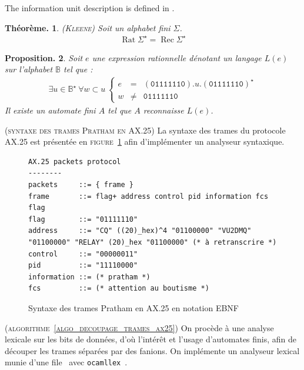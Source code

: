 \documentclass[twocolumn,pre,floats,aps,amsmath,amssymb]{revtex4}
\newtheorem{theorem}{Th\'eor\`eme.}[section]
\newtheorem{proposition}[theorem]{Proposition.}
\newenvironment{implementation}[1][Impl\'ementation.]{\begin{trivlist}
\item[\hskip \labelsep {\bfseries #1}]}{\end{trivlist}}
\newenvironment{remark}[1][Remarque.]{\begin{trivlist}
\item[\hskip \labelsep {\bfseries #1}]}{\end{trivlist}}
\begin{document}
The information unit description is defined in \cite{IITB}.

\begin{theorem}
  { \color{rltred}{\Radioactivity} }
  \textsc{(Kleene)} Soit un alphabet fini $\Sigma$.
  \begin{eqnarray*}
    \operatorname{Rat} \Sigma^{\star} = \operatorname{Rec} \Sigma^{\star} 
  \end{eqnarray*}
\end{theorem}

\begin{proposition}
  { \color{rltred}{\Radioactivity} }
  Soit $e$ une expression rationnelle d\'enotant un langage $L(e)$ sur l'alphabet $\mathbb{B}$ tel que :
  \begin{eqnarray}
    \exists u \in \mathbb{B}^{\star} \ \forall w \subset u \
    \left\{\begin{matrix}
        e &=& (\texttt{01111110}) . u . (\texttt{01111110})^{\star}\\ 
        w &\neq& \texttt{01111110}
      \end{matrix}\right.
  \end{eqnarray}
Il existe un automate fini $A$ tel que $A$ reconnaisse $L (e)$.
\end{proposition}

\begin{remark}
  (\textsc{syntaxe des trames Pratham en AX.25})
  La syntaxe des trames du protocole AX.25 est pr\'esent\'ee en \textsc{figure}~\ref{fig:EBNF_ax25} afin d'impl\'ementer un analyseur syntaxique.
\end{remark}

\begin{figure}
{\scriptsize
\begin{verbatim}
AX.25 packets protocol
--------
packets     ::= { frame }
frame       ::= flag+ address control pid information fcs flag
flag        ::= "01111110"
address     ::= "CQ" ((20)_hex)^4 "01100000" "VU2DMQ" "01100000" "RELAY" (20)_hex "01100000" (* à retranscrire *)
control     ::= "00000011"
pid         ::= "11110000"
information ::= (* pratham *)
fcs         ::= (* attention au boutisme *)
\end{verbatim}
}
\caption{Syntaxe des trames Pratham en AX.25 en notation EBNF}
\label{fig:EBNF_ax25}
\end{figure}


\begin{implementation}
  (\textsc{algorithme~\ref{algo_decoupage_trames_ax25}})
  { \color{rltred}{\Radioactivity} }
  On proc\`ede \`a une analyse lexicale sur les bits de donn\'ees, d'o\`u l'int\'er\^et et l'usage d'automates finis, afin de d\'ecouper les trames s\'epar\'ees par des fanions. On impl\'emente un analyseur lexical munie d'une file\cite{Comment2}~\cite{Knuth} avec \texttt{ocamllex}~\cite{ocaml_parsing}.
\end{implementation}
\end{document}
